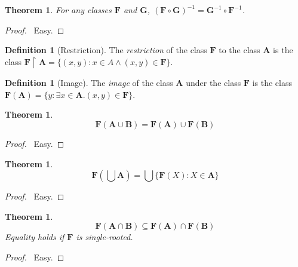 \documentclass{article}
\let\qed\relax
\newtheorem{theorem}[axiom]{Theorem}
\theoremstyle{definition}
\newtheorem{definition}[axiom]{Definition}
\newcommand{\inv}[1]{\ensuremath{{#1}^{-1}}}
\begin{document}
    \begin{theorem}
        For any classes $\mathbf{F}$ and $\mathbf{G}$, $\inv{(\mathbf{F} \circ \mathbf{G})} =
        \inv{\mathbf{G}} \circ \inv{\mathbf{F}}$.
    \end{theorem}

    \begin{proof}
        \pf\ Easy. \qed
    \end{proof}

    \begin{definition}[Restriction]
        The \emph{restriction} of the class $\mathbf{F}$ to the class $\mathbf{A}$ is the class
        $\mathbf{F} \restriction \mathbf{A} = \{ (x,y) : x \in A \wedge (x,y) \in \mathbf{F} \}$.
    \end{definition}

    \begin{definition}[Image]
        The \emph{image} of the class $\mathbf{A}$ under the class $\mathbf{F}$ is the class
        $\mathbf{F}(\mathbf{A}) = \{ y : \exists x \in \mathbf{A}. (x,y) \in \mathbf{F} \}$.
    \end{definition}
    
    \begin{theorem}
        \[ \mathbf{F}(\mathbf{A} \cup \mathbf{B}) = \mathbf{F}(\mathbf{A}) \cup \mathbf{F}(\mathbf{B}) \]
    \end{theorem}

    \begin{proof}
        \pf\ Easy. \qed
    \end{proof}

    \begin{theorem}
        \[ \mathbf{F}(\bigcup \mathbf{A}) = \bigcup \{ \mathbf{F}(X) : X \in \mathbf{A} \} \]
    \end{theorem}

    \begin{proof}
        \pf\ Easy. \qed
    \end{proof}
    
    \begin{theorem}
        \[ \mathbf{F}(\mathbf{A} \cap \mathbf{B}) \subseteq \mathbf{F}(\mathbf{A}) \cap \mathbf{F}(\mathbf{B}) \]
        Equality holds if $\mathbf{F}$ is single-rooted.
    \end{theorem}

    \begin{proof}
        \pf\ Easy. \qed
    \end{proof}
\end{document}
